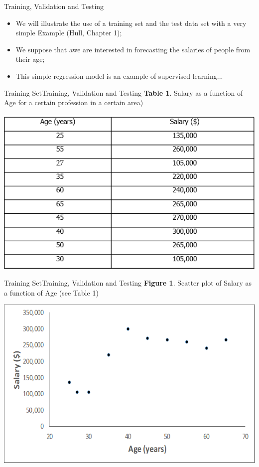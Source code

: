 \documentclass[11pt]{beamer}
\begin{document}
%
%
\begin{frame}{Training, Validation and Testing}
\begin{itemize}
\item We will illustrate the use of a training set and the test data set with a very simple Example (Hull, Chapter 1);
\item We suppose that awe are interested in forecasting the salaries of people from their age;
\item This simple regression model is an example of supervised learning...
\end{itemize}
\end{frame}
%
%
\begin{frame}{Training Set}{Training, Validation and Testing}
\textbf{Table 1}. Salary as a function of Age for a certain profession in a certain area)
	\begin{center}
	\includegraphics[scale=.6]{../05-pictures/lesson-2-1_pic_0.png}
	\end{center}
\end{frame}
%
%
\begin{frame}{Training Set}{Training, Validation and Testing}
\textbf{Figure 1}. Scatter plot of Salary as a function of Age (see Table 1)
	\begin{center}
	\includegraphics[scale=.6]{../05-pictures/lesson-2-1_pic_1.png}
	\end{center}
\end{frame}
\end{document}

